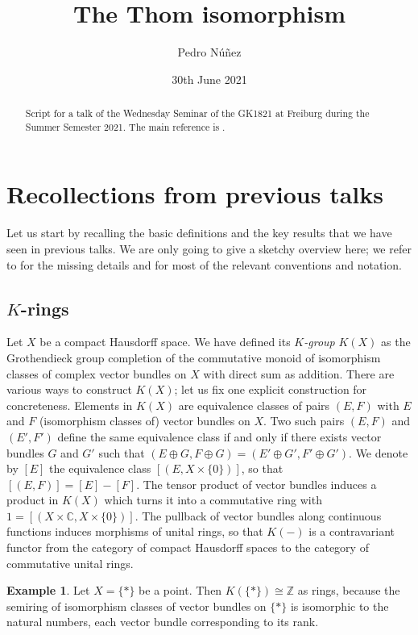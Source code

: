 \documentclass[12pt,a4paper]{amsart}
\title[The Thom isomorphism]{The Thom isomorphism}
\author[Pedro N\'{u}\~{n}ez]{Pedro N\'{u}\~{n}ez}
\date{30th June 2021}
\theoremstyle{plain}
\theoremstyle{definition}
\newtheorem{exmp}[thm]{Example}
\theoremstyle{remark}
\begin{document}
\maketitle

\begin{abstract}
  Script for a talk of the Wednesday Seminar of the GK1821 at Freiburg during the Summer Semester 2021.
  The main reference is \cite[\S 2]{ati67}.
\end{abstract}

\tableofcontents

\section{Recollections from previous talks}

Let us start by recalling the basic definitions and the key results that we have seen in previous talks.
We are only going to give a sketchy overview here; we refer to \cite{ati67} for the missing details and for most of the relevant conventions and notation.

\subsection{$K$-rings}

Let $X$ be a compact Hausdorff space.
We have defined its \textit{$K$-group} $K(X)$ as the Grothendieck group completion of the commutative monoid of isomorphism classes of complex vector bundles on $X$ with direct sum as addition.
There are various ways to construct $K(X)$; let us fix one explicit construction for concreteness.
Elements in $K(X)$ are equivalence classes of pairs $(E,F)$ with $E$ and $F$ (isomorphism classes of) vector bundles on $X$.
Two such pairs $(E,F)$ and $(E',F')$ define the same equivalence class if and only if there exists vector bundles $G$ and $G'$ such that $(E \oplus G, F \oplus G) = (E' \oplus G', F' \oplus G')$.
We denote by $[E]$ the equivalence class $[(E,X \times \{ 0\})]$, so that $[(E,F)] = [E] - [F]$.
The tensor product of vector bundles induces a product in $K(X)$ which turns it into a commutative ring with $1 = [(X \times \mathbb{C}, X \times \{ 0 \})]$.
The pullback of vector bundles along continuous functions induces morphisms of unital rings, so that $K(-)$ is a contravariant functor from the category of compact Hausdorff spaces to the category of commutative unital rings.

\begin{exmp}
  Let $X = \{ * \}$ be a point.
  Then $K(\{ * \}) \cong \mathbb{Z}$ as rings, because the semiring of isomorphism classes of vector bundles on $\{ * \}$ is isomorphic to the natural numbers, each vector bundle corresponding to its rank.
\end{exmp}
\end{document}
